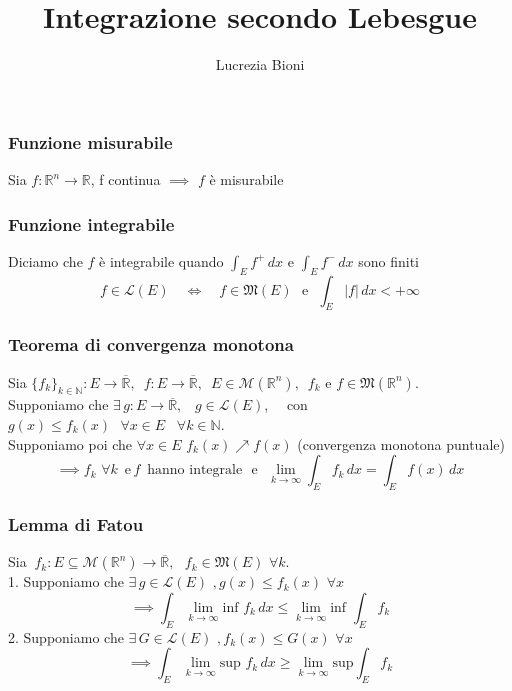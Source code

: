 \documentclass{article} %
\title{Integrazione secondo Lebesgue} %
\author{Lucrezia Bioni} %
\date{} %
\begin{document}
    \maketitle

    \subsubsection*{Funzione misurabile}
    Sia $f:\mathbb{R} ^n \to \mathbb{R} $, f continua $\implies$ $f$ è misurabile  

    \subsubsection*{Funzione integrabile}
    Diciamo che $f$ è integrabile quando $\int_{E}^{ }f^+\,dx$ e $\int_{E}^{ }f^-\,dx$ sono finiti
    $$ f \in \mathcal{L} (E) \, \, \, \, \, \,  \Longleftrightarrow \, \, \, \, \, \,  f \in \mathfrak{M} (E) \,\, \, \,  \text{e} \,\, \, \,  \int_{E}^{ }|f|\,dx < +\infty  $$


    \subsubsection*{Teorema di convergenza monotona}
    Sia $ \{ f_k \}_{k\in\mathbb{N}}: E \to \overline{\mathbb{R}}, \,\,\, f: E \to \overline{\mathbb{R}}, \,\,\, E \in \mathcal{M} (\mathbb{R} ^n) , \,\,\, f_k \text{ e } f \in \mathfrak{M}(\mathbb{R} ^n) $. \\ Supponiamo che $\exists \, g: E \to \overline{\mathbb{R}}, \,\,\,\,\, g \in \mathcal{L} (E) $, \,\,\,\, con $g(x)\leq f_k(x) \, \,\,\, \forall x \in E \, \,\,\,\, \forall k \in \mathbb{N} $. \\ Supponiamo poi che $\forall x \in E$ $f_k(x)\nearrow f(x)$ (convergenza monotona puntuale)
    $$ \implies f_k \, \, \forall k \,\,\, \text{e} \, f \,\,\, \text{hanno integrale} \,\,\,\, \text{e} \,\,\,\, \lim_{k \to \infty} \int_{E}^{}f_k \,dx = \int_{E}^{}f(x) \,dx $$

    \subsubsection*{Lemma di Fatou}
    Sia $ \ f_k: E \subseteq \mathcal{M} (\mathbb{R} ^n) \to \overline{\mathbb{R}} , \,\,\,\, f_k \in \mathfrak{M} (E) \,\, \forall k$. \\ 1. Supponiamo che $\exists \, g \in \mathcal{L} (E) \,\, , g(x) \leq f_k(x) \,\, \forall x $
    $$ \implies \int_{E}^{}   \lim_{k \to \infty} \text{inf }f_k \,dx  \leq  \lim_{k \to \infty} \text{inf }\int_{E}^{}f_k$$
    2. Supponiamo che $\exists \, G \in \mathcal{L} (E) \,\, , f_k(x) \leq G(x) \,\, \forall x $
    $$ \implies \int_{E}^{}   \lim_{k \to \infty} \text{sup }f_k \,dx  \geq  \lim_{k \to \infty} \text{sup} \int_{E}^{}f_k$$
  
\end{document}
